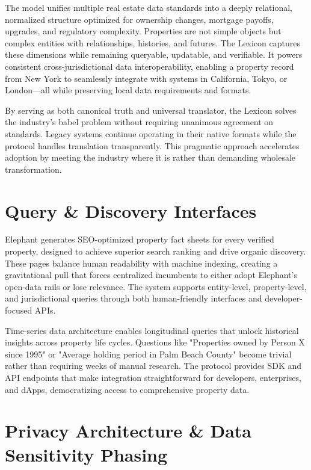 The model unifies multiple real estate data standards into a deeply relational, normalized structure optimized for ownership changes, mortgage payoffs, upgrades, and regulatory complexity. Properties are not simple objects but complex entities with relationships, histories, and futures. The Lexicon captures these dimensions while remaining queryable, updatable, and verifiable. It powers consistent cross-jurisdictional data interoperability, enabling a property record from New York to seamlessly integrate with systems in California, Tokyo, or London—all while preserving local data requirements and formats.

By serving as both canonical truth and universal translator, the Lexicon solves the industry's babel problem without requiring unanimous agreement on standards. Legacy systems continue operating in their native formats while the protocol handles translation transparently. This pragmatic approach accelerates adoption by meeting the industry where it is rather than demanding wholesale transformation.

\section{Query \& Discovery Interfaces}

Elephant generates SEO-optimized property fact sheets for every verified property, designed to achieve superior search ranking and drive organic discovery. These pages balance human readability with machine indexing, creating a gravitational pull that forces centralized incumbents to either adopt Elephant's open-data rails or lose relevance. The system supports entity-level, property-level, and jurisdictional queries through both human-friendly interfaces and developer-focused APIs.

Time-series data architecture enables longitudinal queries that unlock historical insights across property life cycles. Questions like "Properties owned by Person X since 1995" or "Average holding period in Palm Beach County" become trivial rather than requiring weeks of manual research. The protocol provides SDK and API endpoints that make integration straightforward for developers, enterprises, and dApps, democratizing access to comprehensive property data.

\section{Privacy Architecture \& Data Sensitivity Phasing}

